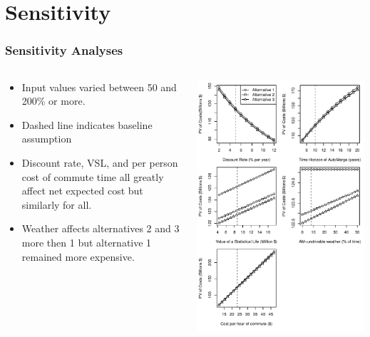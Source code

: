 \documentclass{beamer}
\begin{document}
\section{Sensitivity}
\begin{frame}
  \frametitle{Sensitivity Analyses}
  \begin{columns}
    \begin{column}{0.35\textwidth}
      \begin{itemize}
      \item Input values varied between 50 and 200\% or more. 
      \item Dashed line indicates baseline assumption
      \item Discount rate, VSL, and per person cost of commute time
        all greatly affect net expected cost but similarly for all.
      \item Weather affects alternatives 2 and 3 more then 1 but
        alternative 1 remained more expensive.
      \end{itemize}
    \end{column}
    \begin{column}{0.65\textwidth}
      \centering
      \includegraphics[width=\textwidth]{../../R/sensitivity}
    \end{column}
  \end{columns}
\end{frame}
\end{document}
